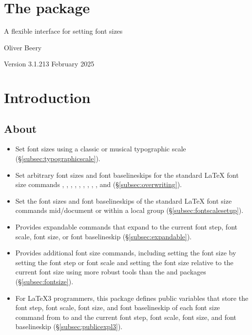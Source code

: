 \documentclass{beery}
\begin{document}
\section*
  {%
    The  package%
  }

A flexible interface for setting font sizes

Oliver Beery

Version 3.1.2\quad{}13 February 2025


\section{Introduction}
\label{sec:intro}

\subsection{About}
\label{subsec:about}

\begin{itemize}
  \item
  Set font sizes using a classic or musical typographic scale (\S\ref{subsec:typographicscale}).
  \item
  Set arbitrary font sizes and font baselineskips for the standard \LaTeX{} font size commands , , , , , , , , , and  (\S\ref{subsec:overwriting}).
  \item
  Set the font sizes and font baselineskips of the standard \LaTeX{} font size commands mid\-/document or within a local group (\S\ref{subsec:fontscalesetup}).
  \item
  Provides expandable commands that expand to the current font step, font scale, font size, or font baselineskip (\S\ref{subsec:expandable}).
  \item
  Provides additional font size commands, including setting the font size by setting the font step or font scale and setting the font size relative to the current font size using more robust tools than the  and  packages (\S\ref{subsec:fontsize}).
  \item
  For \LaTeX3 programmers, this package defines public  variables that store the font step, font scale, font size, and font baselineskip of each font size command from  to  and the current font step, font scale, font size, and font baselineskip (\S\ref{subsec:publicexpl3}).
\end{itemize}
\end{document}
